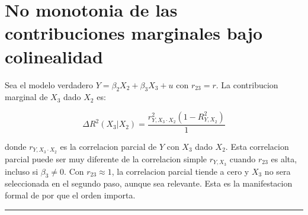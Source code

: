 \documentclass[12pt, letterpaper]{article}
\theoremstyle{remark}
\begin{document}
\section{No monotonia de las contribuciones marginales bajo colinealidad}

Sea el modelo verdadero $Y = \beta_2 X_2 + \beta_3 X_3 + u$ con $r_{23} = r$.
La contribucion marginal de $X_3$ dado $X_2$ es:

\begin{equation}
  \Delta R^2(X_3|X_2)
    = \frac{r_{Y,X_3\cdot X_2}^2 (1 - R^2_{Y,X_2})}{1}
  \label{eq:delta_R2}
\end{equation}

donde $r_{Y,X_3 \cdot X_2}$ es la correlacion parcial de $Y$ con $X_3$
dado $X_2$. Esta correlacion parcial puede ser muy diferente de la correlacion
simple $r_{Y,X_3}$ cuando $r_{23}$ es alta, incluso si $\beta_3 \neq 0$.
Con $r_{23} \approx 1$, la correlacion parcial tiende a cero y $X_3$ no sera
seleccionada en el segundo paso, aunque sea relevante. Esta es la manifestacion
formal de por que el orden importa.

\vspace{14pt}
\noindent\rule{\linewidth}{0.4pt}

\end{document}
